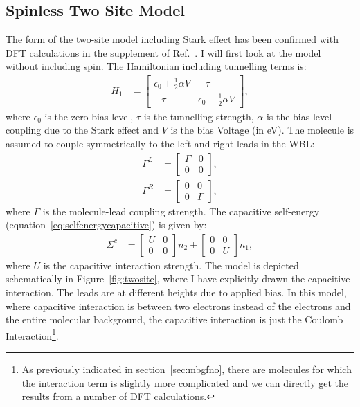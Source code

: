 \subsection{Spinless Two Site Model}
The form of the two-site model including Stark effect has been confirmed with DFT calculations in the supplement of Ref.~\cite{perrinnano}. I  will first look at the model without including spin. The Hamiltonian including tunnelling terms is:
\begin{align}
H_1 &= \begin{bmatrix} \epsilon_0 + \frac{1}{2} \alpha V & -\tau \\
-\tau & \epsilon_0 - \frac{1}{2} \alpha V\end{bmatrix},
\label{eq:spinlesshamiltonian}
\end{align}
where $\epsilon_0$ is the zero-bias level, $\tau$ is the tunnelling strength, $\alpha$ is the bias-level coupling due to the Stark effect and $V$ is the bias Voltage (in eV). The molecule is assumed to couple symmetrically to the left and right leads in the WBL:
\begin{align*}
\Gamma^L &= \begin{bmatrix} \Gamma & 0 \\ 0 & 0 \end{bmatrix},\\ \Gamma^R &= \begin{bmatrix} 0 & 0 \\ 0 & \Gamma \end{bmatrix},
\end{align*}
where $\Gamma$ is the molecule-lead coupling strength. The capacitive self-energy (equation~\ref{eq:selfenergycapacitive}) is given by:
\begin{align*}
\Sigma^c &= \begin{bmatrix} U & 0 \\ 0 & 0 \end{bmatrix} n_2 + \begin{bmatrix} 0 & 0 \\ 0 & U \end{bmatrix} n_1,
\end{align*}
where $U$ is the capacitive interaction strength.  The model is depicted schematically in Figure~\ref{fig:twosite}, where I have explicitly drawn the capacitive interaction. The leads are at different heights due to applied bias. In this model, where capacitive interaction is between two electrons instead of the electrons and the entire molecular background, the capacitive interaction is just the Coulomb Interaction\footnote{As previously indicated in section~\ref{sec:mbgfno}, there are molecules for which the interaction term is slightly more complicated and we can directly get the results from a number of DFT calculations.}.

